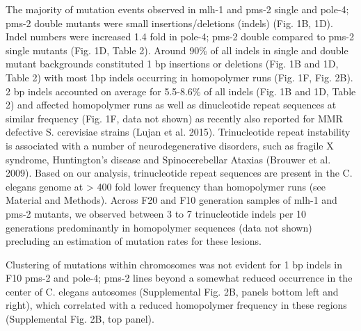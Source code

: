 The majority of mutation events observed in mlh-1 and pms-2 single and pole-4; pms-2 
double mutants were small insertions/deletions (indels) (Fig. 1B, 1D). Indel numbers 
were increased 1.4 fold in pole-4; pms-2 double compared to pms-2 single mutants 
(Fig. 1D, Table 2). Around 90\% of all indels in single and double mutant backgrounds 
constituted 1 bp insertions or deletions (Fig. 1B and 1D, Table 2) with most 1bp 
indels occurring in homopolymer runs (Fig. 1F, Fig. 2B). 2 bp indels accounted on 
average for 5.5-8.6\% of all indels (Fig. 1B and 1D, Table 2) and affected homopolymer 
runs as well as dinucleotide repeat sequences at similar frequency (Fig. 1F, data not shown) 
as recently also reported for MMR defective S. cerevisiae strains (Lujan et al. 2015). 
Trinucleotide repeat instability is associated with a number of neurodegenerative disorders, 
such as fragile X syndrome, Huntington’s disease and Spinocerebellar Ataxias (Brouwer et al. 2009). 
Based on our analysis, trinucleotide repeat sequences are present in the C. elegans genome 
at > 400 fold lower frequency than homopolymer runs (see Material and Methods). Across F20 
and F10 generation samples of mlh-1 and pms-2 mutants, we observed between 3 to 7 
trinucleotide indels per 10 generations predominantly in homopolymer sequences 
(data not shown) precluding an estimation of mutation rates for these lesions. 


Clustering of mutations within chromosomes was not evident for 1 bp indels in F10 pms-2 and pole-4; pms-2 lines beyond a somewhat reduced occurrence in the center of C. elegans autosomes (Supplemental Fig. 2B, panels bottom left and right), which correlated with a reduced homopolymer frequency in these regions (Supplemental Fig. 2B, top panel).

